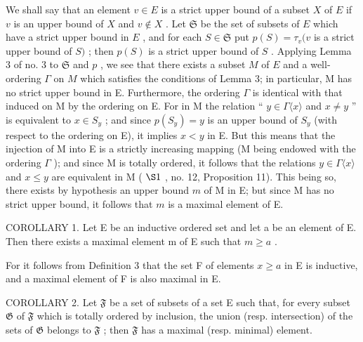 We shall say that an element \(v \in E\) is a strict upper bound of a subset \(X\) of \(E\) if \(v\) is an upper bound of \(X\) and \(v \notin X\) . Let \(\mathfrak{S}\) be the set of subsets of \(E\) which have a strict upper bound in \(E\) , and for each \(S \in \mathfrak{S}\) put \(p(S) = \tau_v(v\) is a strict upper bound of \(S)\) ; then \(p(S)\) is a strict upper bound of \(S\) . Applying Lemma 3 of no. 3 to \(\mathfrak{S}\) and \(p\) , we see that there exists a subset \(M\) of \(E\) and a well-ordering \(\Gamma\) on \(M\) which satisfies the conditions of Lemma 3; in particular, M has no strict upper bound in E. Furthermore, the ordering \(\Gamma\) is identical with that induced on M by the ordering on E. For in M the relation `` \(y \in \Gamma\langle x \rangle\) and \(x \neq y\) '' is equivalent to \(x \in S_y\) ; and since \(p(S_y) = y\) is an upper bound of \(S_y\) (with respect to the ordering on E), it implies \(x < y\) in E. But this means that the injection of M into E is a strictly increasing mapping (M being endowed with the ordering \(\Gamma\) ); and since M is totally ordered, it follows that the relations \(y \in \Gamma\langle x \rangle\) and \(x \leqslant y\) are equivalent in M ( \(\S 1\) , no. 12, Proposition 11). This being so, there exists by hypothesis an upper bound \(m\) of M in E; but since M has no strict upper bound, it follows that \(m\) is a maximal element of E.

COROLLARY 1. Let E be an inductive ordered set and let a be an element of E. Then there exists a maximal element m of E such that \(m \geqslant a\) .

For it follows from Definition 3 that the set F of elements \(x \geqslant a\) in E is inductive, and a maximal element of F is also maximal in E.

COROLLARY 2. Let \(\mathfrak{F}\) be a set of subsets of a set E such that, for every subset \(\mathfrak{G}\) of \(\mathfrak{F}\) which is totally ordered by inclusion, the union (resp. intersection) of the sets of \(\mathfrak{G}\) belongs to \(\mathfrak{F}\) ; then \(\mathfrak{F}\) has a maximal (resp. minimal) element.

